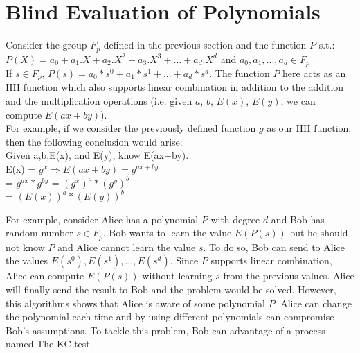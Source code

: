 \documentclass[twoside]{article}
\begin{document}
\section{Blind Evaluation of Polynomials}
Consider the group $F_p$ defined in the previous section and the function $P$ s.t.:\\$P(X) = a_0 + a_1.X + a_2.X^2 + a_3.X^3 + ... + a_d.X^d$ and $a_0, a_1, ..., a_d \in F_p$\\
If $s \in F_p$, $P(s) = a_0*s^0 + a_1*s^1 + ... + a_d*s^d$. The function $P$ here acts as an HH function which also supports linear combination in addition to the addition and the multiplication operations (i.e. given $a$, $b$, $E(x)$, $E(y)$, we can compute $E(ax+by)$).\\
For example, if we consider the previously defined function $g$ as our HH function, then the following conclusion would arise. \\

Given a,b,E(x), and E(y), know E(ax+by). \\
E(x) = $g^x \Rightarrow E(ax+by) = g^{ax + by}$ \\
= $g^{ax} * g^{by}$ = $(g^x)^a * (g^y)^b$ \\
= $(E(x))^a * (E(y))^b$

For example, consider Alice has a polynomial $P$ with degree $d$ and Bob has random number $s \in F_p$. Bob wants to learn the value $E(P(s))$ but he should not know $P$ and Alice cannot learn the value $s$. To do so, Bob can send to Alice the values $E(s^0), E(s^1), ..., E(s^d)$. Since $P$ supports linear combination, Alice can compute $E(P(s))$ without learning $s$ from the previous values. Alice will finally send the result to Bob and the problem would be solved. However, this algorithms shows that Alice is aware of some polynomial $P$. Alice can change the polynomial each time and by using different polynomials can compromise Bob's assumptions. To tackle this problem, Bob can advantage of a process named The KC test.

\begin{comment}
\subsubsection{The KC test}
Consider $\alpha \in F_p$, $g$: generator of group $G$ which $|G|=p$. We call $(a, b)$ an $\alpha$-pair if $b=\alpha.a$. The algorithm is as follows:
\begin{enumerate}[topsep=0pt,itemsep=-1ex,partopsep=1ex,parsep=1ex]
    \item Bob chooses a random $\alpha \in F_p$ and $a \in G$ and computes $b=\alpha.a$
    \item Bob sends Alice the pair $(a, b)$
    \item Alice responses back with the pair $(a', b')$
    \item Bob checks whether $b' = \alpha.a'$
\end{enumerate}
This test shows that Alice is using an $\alpha$ and is not sending us totally random numbers.
\end{comment}
\end{document}
